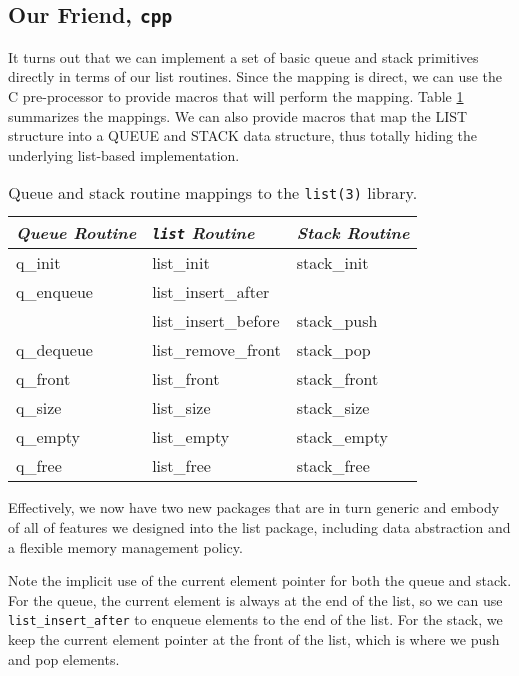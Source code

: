 \subsection{Our Friend, {\tt cpp}}
It turns out that we can implement a set of basic queue and stack primitives
directly in terms of our list routines.  Since the mapping is direct, we can
use the C pre-processor to provide macros that will perform the
mapping.  Table \ref{mappings} summarizes the mappings.  We can also provide
macros that map the LIST structure into a QUEUE and STACK data structure, thus
totally hiding the underlying list-based implementation.
\begin{table}[t]
\begin{centering}
\begin{tabular}{|l|l|l|} \hline
{\em Queue Routine} & {\em {\tt list} Routine} & {\em Stack Routine} \\ \hline \hline
q\_init             & list\_init	       & stack\_init  \\ \hline
q\_enqueue          & list\_insert\_after      &              \\ \hline
                    & list\_insert\_before     & stack\_push  \\ \hline
q\_dequeue          & list\_remove\_front      & stack\_pop   \\ \hline
q\_front            & list\_front	       & stack\_front \\ \hline
q\_size             & list\_size	       & stack\_size  \\ \hline
q\_empty            & list\_empty	       & stack\_empty \\ \hline
q\_free             & list\_free	       & stack\_free  \\ \hline
\end{tabular}
\caption{Queue and stack routine mappings to the {\tt list(3)} library.}
\label{mappings}
\end{centering}
\end{table}
Effectively, we now have two new packages that are in turn generic and
embody of all of features we designed into the list package, including
data abstraction and a flexible memory management policy.

Note the implicit use of the current element pointer for both the queue and
stack.  For the queue, the current element is always at the end of the list,
so we can use {\tt list\_insert\_after} to enqueue elements to the end of the
list.  For the stack, we keep the current element pointer at the front of the
list, which is where we push and pop elements.

